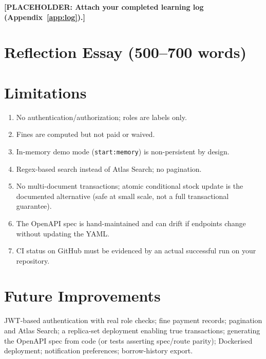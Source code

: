 \documentclass[12pt,a4paper]{article}
\newcommand{\placeholder}[1]{\textbf{[PLACEHOLDER: #1]}}
\begin{document}
\placeholder{Attach your completed learning log (Appendix~\ref{app:log}).}

\section{Reflection Essay (500--700 words)}


\section{Limitations}
\begin{enumerate}[leftmargin=1.5em]
  \item No authentication/authorization; roles are labels only.
  \item Fines are computed but not paid or waived.
  \item In-memory demo mode (\texttt{start:memory}) is non-persistent by design.
  \item Regex-based search instead of Atlas Search; no pagination.
  \item No multi-document transactions; atomic conditional stock update is
        the documented alternative (safe at small scale, not a full
        transactional guarantee).
  \item The OpenAPI spec is hand-maintained and can drift if endpoints change
        without updating the YAML.
  \item CI status on GitHub must be evidenced by an actual successful run on
        your repository.
\end{enumerate}

\section{Future Improvements}
JWT-based authentication with real role checks; fine payment records;
pagination and Atlas Search; a replica-set deployment enabling true
transactions; generating the OpenAPI spec from code (or tests asserting
spec/route parity); Dockerised deployment; notification preferences;
borrow-history export.

\end{document}
